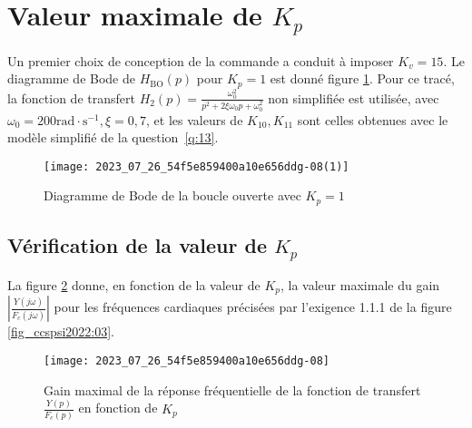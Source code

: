 \section{\label{sec:III.A} Valeur maximale de $K_{p}$}


Un premier choix de conception de la commande a conduit à imposer $K_{v}=15$. Le diagramme de Bode de $H_{\mathrm{BO}}(p)$ pour $K_{p}=1$ est donné figure \ref{fig_ccspsi2022:12}. Pour ce tracé, la fonction de transfert $H_{2}(p)=\frac{\omega_{0}^{2}}{p^{2}+2 \xi \omega_{0} p+\omega_{0}^{2}}$ non simplifiée est utilisée, avec $\omega_{0}=200 \mathrm{rad} \cdot \mathrm{s}^{-1}, \xi=0,7$, et les valeurs de $K_{10}, K_{11}$ sont celles obtenues avec le modèle simplifié de la question~\ref{q:13}.


\begin{figure}[!h]
\centering
\texttt{[image: 2023\_07\_26\_54f5e859400a10e656ddg-08(1)]}
\caption{\label{fig_ccspsi2022:12}Diagramme de Bode de la boucle ouverte avec $K_{p}=1$}
\end{figure}


\subsection{\label{sec:III.B} Vérification de la valeur de $K_{p}$}

La figure \ref{fig_ccspsi2022:13} donne, en fonction de la valeur de $K_{p}$, la valeur maximale du gain $\left|\frac{Y(j \omega)}{F_{c}(j \omega)}\right|$ pour les fréquences cardiaques précisées par l'exigence 1.1.1 de la figure \ref{fig_ccspsi2022:03}.


\begin{figure}[!h]
\centering
\texttt{[image: 2023\_07\_26\_54f5e859400a10e656ddg-08]}
\caption{\label{fig_ccspsi2022:13}Gain maximal de la réponse fréquentielle de la fonction de transfert $\frac{Y(p)}{F_{c}(p)}$ en fonction de $K_{p}$}
\end{figure}

